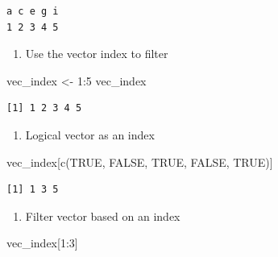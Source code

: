 \documentclass[
  letterpaper,
  DIV=11,
  numbers=noendperiod]{scrreprt}
\newenvironment{Shaded}{\begin{snugshade}}{\end{snugshade}}
\newcommand{\ConstantTok}[1]{\textcolor[rgb]{0.56,0.35,0.01}{#1}}
\newcommand{\DecValTok}[1]{\textcolor[rgb]{0.68,0.00,0.00}{#1}}
\newcommand{\FunctionTok}[1]{\textcolor[rgb]{0.28,0.35,0.67}{#1}}
\newcommand{\NormalTok}[1]{\textcolor[rgb]{0.00,0.23,0.31}{#1}}
\newcommand{\OtherTok}[1]{\textcolor[rgb]{0.00,0.23,0.31}{#1}}
\newcommand{\SpecialCharTok}[1]{\textcolor[rgb]{0.37,0.37,0.37}{#1}}
\providecommand{\tightlist}{%
  \setlength{\itemsep}{0pt}\setlength{\parskip}{0pt}}\usepackage{longtable,booktabs,array}
\begin{document}
\begin{verbatim}
a c e g i 
1 2 3 4 5 
\end{verbatim}

\begin{enumerate}
\def\labelenumi{\arabic{enumi}.}
\setcounter{enumi}{1}
\tightlist
\item
  Use the vector index to filter
\end{enumerate}

\begin{Shaded}
\begin{Highlighting}[]
\NormalTok{vec\_index }\OtherTok{\textless{}{-}} \DecValTok{1}\SpecialCharTok{:}\DecValTok{5}
\NormalTok{vec\_index}
\end{Highlighting}
\end{Shaded}

\begin{verbatim}
[1] 1 2 3 4 5
\end{verbatim}

\begin{enumerate}
\def\labelenumi{\alph{enumi})}
\tightlist
\item
  Logical vector as an index
\end{enumerate}

\begin{Shaded}
\begin{Highlighting}[]
\NormalTok{vec\_index[}\FunctionTok{c}\NormalTok{(}\ConstantTok{TRUE}\NormalTok{, }\ConstantTok{FALSE}\NormalTok{, }\ConstantTok{TRUE}\NormalTok{, }\ConstantTok{FALSE}\NormalTok{, }\ConstantTok{TRUE}\NormalTok{)]}
\end{Highlighting}
\end{Shaded}

\begin{verbatim}
[1] 1 3 5
\end{verbatim}

\begin{enumerate}
\def\labelenumi{\alph{enumi})}
\setcounter{enumi}{1}
\tightlist
\item
  Filter vector based on an index
\end{enumerate}

\begin{Shaded}
\begin{Highlighting}[]
\NormalTok{vec\_index[}\DecValTok{1}\SpecialCharTok{:}\DecValTok{3}\NormalTok{]}
\end{Highlighting}
\end{Shaded}
\end{document}
